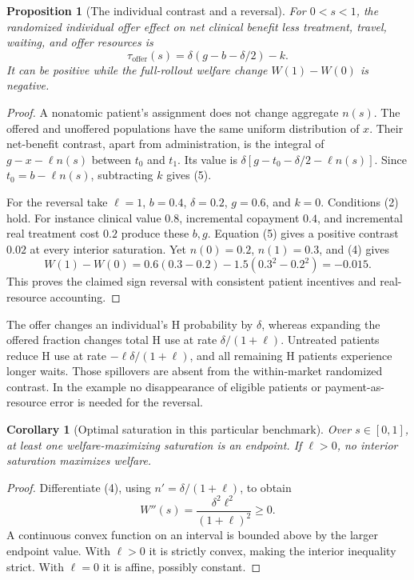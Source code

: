 \documentclass[11pt]{article}
\newtheorem{proposition}[theorem]{Proposition}
\newtheorem{corollary}[theorem]{Corollary}
\theoremstyle{definition}
\begin{document}
\begin{proposition}[The individual contrast and a reversal]
For $0<s<1$, the randomized individual offer effect on net clinical benefit less treatment, travel, waiting, and offer resources is
\[
 \tau_{\mathrm{offer}}(s)=\delta(g-b-\delta/2)-k.
 \tag{5}
\]
It can be positive while the full-rollout welfare change $W(1)-W(0)$ is negative.
\end{proposition}
\begin{proof}
A nonatomic patient's assignment does not change aggregate $n(s)$. The offered and unoffered populations have the same uniform distribution of $x$. Their net-benefit contrast, apart from administration, is the integral of $g-x-\ell n(s)$ between $t_0$ and $t_1$. Its value is
$\delta[g-t_0-\delta/2-\ell n(s)]$. Since $t_0=b-\ell n(s)$, subtracting $k$ gives (5).

For the reversal take $\ell=1$, $b=0.4$, $\delta=0.2$, $g=0.6$, and $k=0$. Conditions (2) hold. For instance clinical value $0.8$, incremental copayment $0.4$, and incremental real treatment cost $0.2$ produce these $b,g$. Equation (5) gives a positive contrast $0.02$ at every interior saturation. Yet $n(0)=0.2$, $n(1)=0.3$, and (4) gives
\[
 W(1)-W(0)=0.6(0.3-0.2)-1.5(0.3^2-0.2^2)=-0.015.
\]
This proves the claimed sign reversal with consistent patient incentives and real-resource accounting.
\end{proof}

The offer changes an individual's H probability by $\delta$, whereas expanding the offered fraction changes total H use at rate $\delta/(1+\ell)$. Untreated patients reduce H use at rate $-\ell\delta/(1+\ell)$, and all remaining H patients experience longer waits. Those spillovers are absent from the within-market randomized contrast. In the example no disappearance of eligible patients or payment-as-resource error is needed for the reversal.

\begin{corollary}[Optimal saturation in this particular benchmark]
Over $s\in[0,1]$, at least one welfare-maximizing saturation is an endpoint. If $\ell>0$, no interior saturation maximizes welfare.
\end{corollary}
\begin{proof}
Differentiate (4), using $n'=\delta/(1+\ell)$, to obtain
\[
 W''(s)=\frac{\delta^2\ell^2}{(1+\ell)^2}\geq0.
\]
A continuous convex function on an interval is bounded above by the larger endpoint value. With $\ell>0$ it is strictly convex, making the interior inequality strict. With $\ell=0$ it is affine, possibly constant.
\end{proof}
\end{document}
